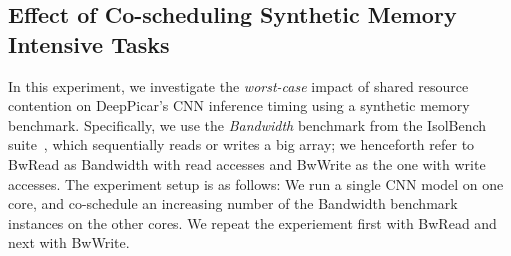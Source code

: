 
\subsection{Effect of Co-scheduling Synthetic Memory Intensive
  Tasks}\label{sec:eval-memhog} 

In this experiment, we investigate the \emph{worst-case} impact of shared 
resource contention on DeepPicar's CNN inference timing using  
a synthetic memory benchmark. Specifically, we use the \emph{Bandwidth}
benchmark from the IsolBench suite~\cite{Valsan2016}, which
sequentially reads or writes a big array; we henceforth refer to BwRead 
as Bandwidth with read accesses and BwWrite as the one with write
accesses. The experiment setup is as follows: We run a single CNN
model on one core, and co-schedule an increasing number of the
Bandwidth benchmark instances on the other cores. We repeat the
experiement first with BwRead and next with BwWrite.

  
